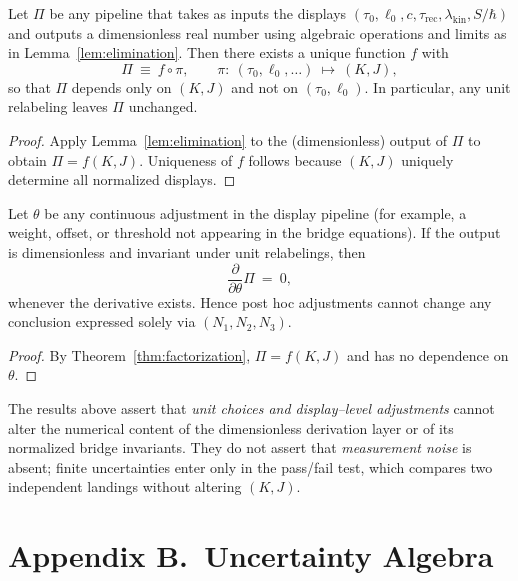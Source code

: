 \documentclass[11pt]{article}
\theoremstyle{plain}
\theoremstyle{definition}
\theoremstyle{remark}
\begin{document}
\begin{theorem}\label{thm:factorization}
Let \(\Pi\) be any pipeline that takes as inputs the displays \((\tau_{0},\ell_{0},c,\tau_{\mathrm{rec}},\lambda_{\mathrm{kin}},S/\hbar)\) and outputs a dimensionless real number using algebraic operations and limits as in Lemma~\ref{lem:elimination}. Then there exists a unique function \(f\) with
\[
\Pi\ \equiv\ f\circ \pi,\qquad \pi:\ (\tau_{0},\ell_{0},\ldots)\ \mapsto\ (K,J),
\]
so that \(\Pi\) depends only on \((K,J)\) and not on \((\tau_{0},\ell_{0})\). In particular, any unit relabeling leaves \(\Pi\) unchanged.
\end{theorem}

\begin{proof}
Apply Lemma~\ref{lem:elimination} to the (dimensionless) output of \(\Pi\) to obtain \(\Pi=f(K,J)\). Uniqueness of \(f\) follows because \((K,J)\) uniquely determine all normalized displays.
\end{proof}

\begin{corollary}
Let \(\theta\) be any continuous adjustment in the display pipeline (for example, a weight, offset, or threshold not appearing in the bridge equations). If the output is dimensionless and invariant under unit relabelings, then
\[
\frac{\partial}{\partial\theta}\Pi\ =\ 0,
\]
whenever the derivative exists. Hence post hoc adjustments cannot change any conclusion expressed solely via \((N_{1},N_{2},N_{3})\).
\end{corollary}

\begin{proof}
By Theorem~\ref{thm:factorization}, \(\Pi=f(K,J)\) and has no dependence on \(\theta\).
\end{proof}

\begin{remark}
The results above assert that \emph{unit choices and display–level adjustments} cannot alter the numerical content of the dimensionless derivation layer or of its normalized bridge invariants. They do not assert that \emph{measurement noise} is absent; finite uncertainties enter only in the pass/fail test, which compares two independent landings without altering \((K,J)\).
\end{remark}

\section*{Appendix B.\ Uncertainty Algebra}
\end{document}
